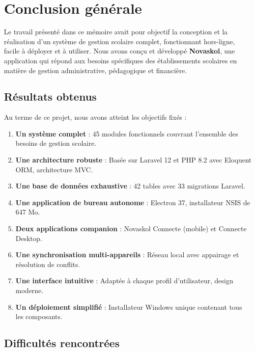 \documentclass[12pt,a4paper,twoside]{report}
\begin{document}
\chapter*{Conclusion générale}

Le travail présenté dans ce mémoire avait pour objectif la conception et la réalisation d'un système de gestion scolaire complet, fonctionnant hors-ligne, facile à déployer et à utiliser. Nous avons conçu et développé \textbf{Novaskol}, une application qui répond aux besoins spécifiques des établissements scolaires en matière de gestion administrative, pédagogique et financière.

\section*{Résultats obtenus}

Au terme de ce projet, nous avons atteint les objectifs fixés :

\begin{enumerate}
    \item \textbf{Un système complet} : 45 modules fonctionnels couvrant l'ensemble des besoins de gestion scolaire.
    \item \textbf{Une architecture robuste} : Basée sur Laravel 12 et PHP 8.2 avec Eloquent ORM, architecture MVC.
    \item \textbf{Une base de données exhaustive} : 42 tables avec 33 migrations Laravel.
    \item \textbf{Une application de bureau autonome} : Electron 37, installateur NSIS de 647 Mo.
    \item \textbf{Deux applications companion} : Novaskol Connecte (mobile) et Connecte Desktop.
    \item \textbf{Une synchronisation multi-appareils} : Réseau local avec appairage et résolution de conflits.
    \item \textbf{Une interface intuitive} : Adaptée à chaque profil d'utilisateur, design moderne.
    \item \textbf{Un déploiement simplifié} : Installateur Windows unique contenant tous les composants.
\end{enumerate}

\section*{Difficultés rencontrées}
\end{document}
